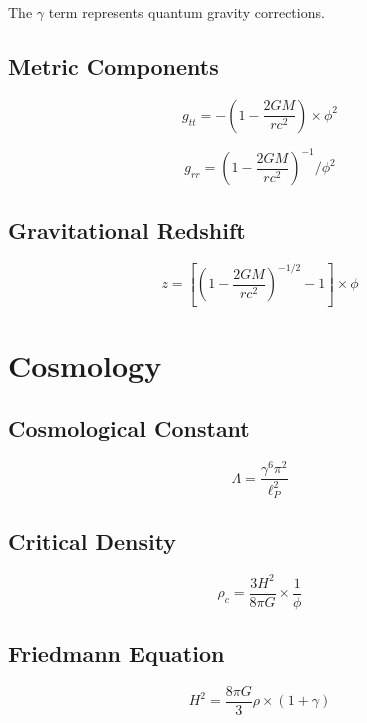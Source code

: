 \documentclass[12pt,a4paper]{article}
\begin{document}
The $\gamma$ term represents quantum gravity corrections.

\subsection{Metric Components}

\begin{equation}
g_{tt} = -\left(1 - \frac{2GM}{rc^2}\right) \times \phi^2
\end{equation}

\begin{equation}
g_{rr} = \left(1 - \frac{2GM}{rc^2}\right)^{-1} / \phi^2
\end{equation}

\subsection{Gravitational Redshift}

\begin{equation}
z = \left[\left(1 - \frac{2GM}{rc^2}\right)^{-1/2} - 1\right] \times \phi
\end{equation}

\section{Cosmology}

\subsection{Cosmological Constant}

\begin{equation}
\Lambda = \frac{\gamma^6 \pi^2}{\ell_P^2}
\end{equation}

\subsection{Critical Density}

\begin{equation}
\rho_c = \frac{3H^2}{8\pi G} \times \frac{1}{\phi}
\end{equation}

\subsection{Friedmann Equation}

\begin{equation}
H^2 = \frac{8\pi G}{3}\rho \times (1 + \gamma)
\end{equation}
\end{document}
